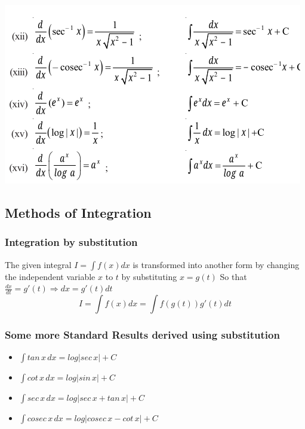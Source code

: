 \documentclass[12pt]{article}
\begin{document}
    \includegraphics*[scale=0.67]{2.png}

    \subsection*{Methods of Integration}
    \subsubsection*{Integration by substitution}
    The given integral $I = \int f(x)dx$ is transformed into another form by changing the independent variable $x$ to $t$ by substituting $x = g(t)$  So that $\frac{dx}{dt} = g'(t) \Rightarrow dx = g'(t)dt$ $$I=\int f(x) dx =\int f(g(t)) g'(t)dt$$

    \subsubsection*{Some more Standard Results derived using substitution}
    \begin{itemize}
        \item $\int tan \,x \, dx =log|sec \, x| +C$
        \item $\int cot \, x \, dx = log |sin \, x | + C $
        \item $\int sec \, x \, dx = log |sec \, x + tan \, x| + C $
        \item $\int cosec \, x \, dx = log |cosec \, x - cot \, x| + C $
    \end{itemize}
\end{document}
